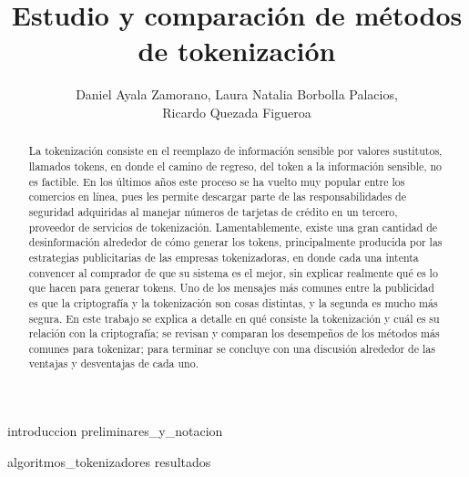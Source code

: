 \documentclass[11pt]{llncs}
\newcommand{\Titulo}{Estudio y comparación de métodos de tokenización}
\begin{document}
  \title{\Titulo}
  \author{Daniel Ayala Zamorano,
     Laura Natalia Borbolla Palacios, \\
     Ricardo Quezada Figueroa}
  \maketitle

  \begin{abstract}
    La tokenización consiste en el reemplazo de información sensible por valores
    sustitutos, llamados tokens, en donde el camino de regreso, del  token a la
    información sensible, no es factible. En los últimos años este proceso se ha
    vuelto muy popular entre los comercios en línea, pues les permite descargar
    parte de las responsabilidades de seguridad adquiridas al manejar números de
    tarjetas de crédito en un tercero, proveedor de servicios de tokenización.
    Lamentablemente, existe una gran cantidad de desinformación alrededor de
    cómo generar los tokens, principalmente producida por las estrategias
    publicitarias de las empresas tokenizadoras, en donde cada una intenta
    convencer al comprador de que su sistema es el mejor, sin explicar realmente
    qué es lo que hacen para generar tokens. Uno de los mensajes más comunes
    entre la publicidad es que la criptografía y la tokenización son cosas
    distintas, y la segunda es mucho más segura. En este trabajo se explica a
    detalle en qué consiste la tokenización y cuál es su relación con la
    criptografía; se revisan y comparan los desempeños de los métodos más comunes
    para tokenizar; para terminar se concluye con una discusión alrededor de las
    ventajas y desventajas de cada uno.
  \end{abstract}

  {introduccion}
  {preliminares_y_notacion}
  
    {algoritmos_tokenizadores}
  {resultados}
\end{document}
